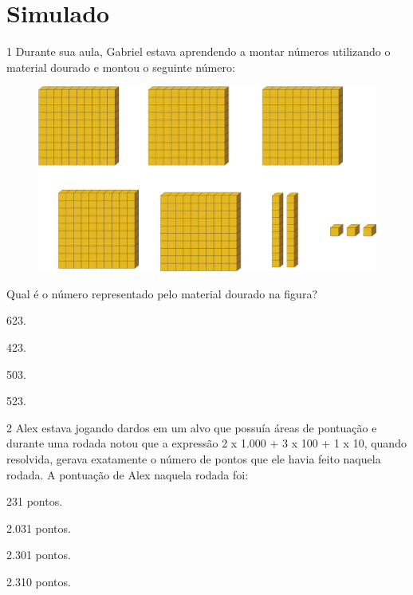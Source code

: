 \setcounter{chapter}{0}
\chapter[Simulado 1]{Simulado}

\num{1} Durante sua aula, Gabriel estava aprendendo a montar números utilizando o
material dourado e montou o seguinte número:

\begin{figure}[htpb!]
\centering
\includegraphics[width=.8\textwidth]{./media/image91.png}
\end{figure}

Qual é o número representado pelo material dourado na figura?

\begin{multicols}{2}
\begin{escolha}
\item
  623.
\item
  423.
\item
  503.
\item
  523.
\end{escolha}
\end{multicols}

\num{2} Alex estava jogando dardos em um alvo que possuía áreas de pontuação e
durante uma rodada notou que a expressão 2 x 1.000 + 3 x 100 + 1 x 10,
quando resolvida, gerava exatamente o número de pontos que ele havia
feito naquela rodada. A pontuação de Alex naquela rodada foi:

\begin{multicols}{2}
\begin{escolha}
\item
  231 pontos.
\item
  2.031 pontos.
\item
  2.301 pontos.
\item
  2.310 pontos.
\end{escolha}
\end{multicols}


